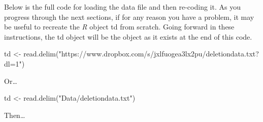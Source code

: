 \documentclass[
  12pt,
  letterpaper]{article}
\newenvironment{Shaded}{\begin{snugshade}}{\end{snugshade}}
\newcommand{\FunctionTok}[1]{\textcolor[rgb]{0.28,0.35,0.67}{#1}}
\newcommand{\NormalTok}[1]{\textcolor[rgb]{0.00,0.23,0.31}{#1}}
\newcommand{\OtherTok}[1]{\textcolor[rgb]{0.00,0.23,0.31}{#1}}
\newcommand{\StringTok}[1]{\textcolor[rgb]{0.13,0.47,0.30}{#1}}
\renewcommand\texttt[1]{{\ttfamily\color{BrickRed}#1}}
\begin{document}
Below is the full code for loading the data file and then re-coding it.
As you progress through the next sections, if for any reason you have a
problem, it may be useful to recreate the \emph{R} object \texttt{td}
from scratch. Going forward in these instructions, the \texttt{td}
object will be the object as it exists at the end of this code.

\begin{Shaded}
\begin{Highlighting}[]
\NormalTok{td }\OtherTok{\textless{}{-}} \FunctionTok{read.delim}\NormalTok{(}\StringTok{"https://www.dropbox.com/s/jxlfuogea3lx2pu/deletiondata.txt?dl=1"}\NormalTok{)}
\end{Highlighting}
\end{Shaded}

Or\ldots{}

\begin{Shaded}
\begin{Highlighting}[]
\NormalTok{td }\OtherTok{\textless{}{-}} \FunctionTok{read.delim}\NormalTok{(}\StringTok{"Data/deletiondata.txt"}\NormalTok{)}
\end{Highlighting}
\end{Shaded}

Then\ldots{}
\end{document}
